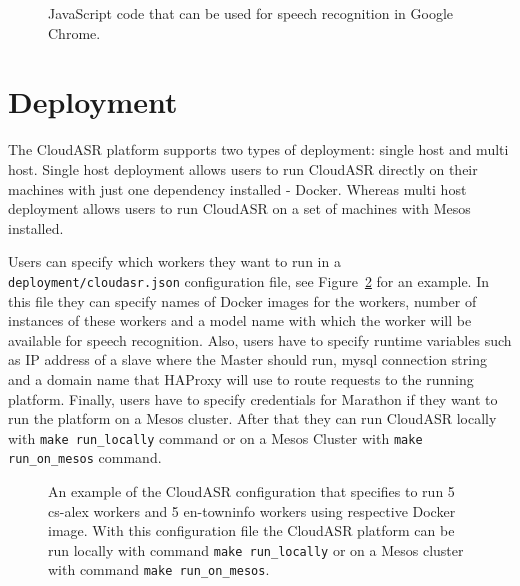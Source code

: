 \begin{figure}[h]
  

  \caption{JavaScript code that can be used for speech recognition in Google Chrome.}
  \label{fig:online}
\end{figure}


\section{Deployment}
The CloudASR platform supports two types of deployment: single host and multi host.
Single host deployment allows users to run CloudASR directly on their machines with just one dependency installed - Docker.
Whereas multi host deployment allows users to run CloudASR on a set of machines with Mesos installed.

Users can specify which workers they want to run in a \texttt{deployment/cloudasr.json} configuration file,
  see Figure~\ref{fig:cloudasr-json} for an example.
In this file they can specify names of Docker images for the workers,
  number of instances of these workers
  and a model name with which the worker will be available for speech recognition.
Also, users have to specify runtime variables such as IP address of a slave where the Master should run,
  mysql connection string and
  a domain name that HAProxy will use to route requests to the running platform.
Finally, users have to specify credentials for Marathon if they want to run the platform on a Mesos cluster.
After that they can run CloudASR locally with \texttt{make run\_locally} command
  or on a Mesos Cluster with \texttt{make run\_on\_mesos} command.

\begin{figure}[h]
  

  \caption{
     An example of the CloudASR configuration that specifies to run 5 cs-alex workers and 5 en-towninfo workers
       using respective Docker image.
     With this configuration file the CloudASR platform can be run locally with command \texttt{make run\_locally}
       or on a Mesos cluster with command \texttt{make run\_on\_mesos}.
  }
  \label{fig:cloudasr-json}
\end{figure}



